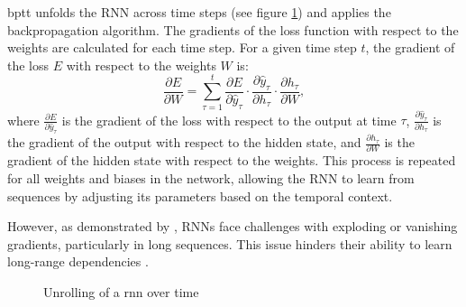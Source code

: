 \documentclass[12pt, a4paper, headinclude, twoside, plainheadsepline, open=right, numbers=noenddot, hidelinks, toc=listof, toc=bibliography]{scrreprt}
\begin{document}
\Ac{bptt} unfolds the RNN across time steps (see figure \ref{fig:rnn_unroll}) and applies the backpropagation algorithm. The gradients of the loss function with respect to the weights are calculated for each time step. For a given time step \( t \), the gradient of the loss \( E \) with respect to the weights \( W \) is:
\begin{equation}
\frac{\partial E}{\partial W} = \sum_{\tau=1}^{t} \frac{\partial E}{\partial \hat{y}_\tau} \cdot \frac{\partial \hat{y}_\tau}{\partial h_\tau} \cdot \frac{\partial h_\tau}{\partial W},
\end{equation}
where $\frac{\partial E}{\partial \hat{y}_\tau}$ is the gradient of the loss with respect to the output at time \( \tau \), \( \frac{\partial \hat{y}_\tau}{\partial h_\tau} \) is the gradient of the output with respect to the hidden state, and \( \frac{\partial h_\tau}{\partial W} \) is the gradient of the hidden state with respect to the weights. This process is repeated for all weights and biases in the network, allowing the RNN to learn from sequences by adjusting its parameters based on the temporal context.

However, as demonstrated by \citeauthor{bengioLearningLongtermDependencies1994} \cite{bengioLearningLongtermDependencies1994}, RNNs face challenges with exploding or vanishing gradients, particularly in long sequences. This issue hinders their ability to learn long-range dependencies \cite{sutskeverTrainingRecurrentNeural2013}. 

\begin{figure}
\centering
\caption{Unrolling of a \ac{rnn} over time}
\label{fig:rnn_unroll}
\end{figure}
\end{document}

